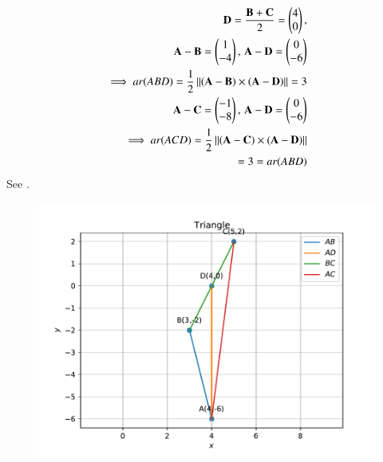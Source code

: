 \begin{align}
\mathbf{D}=\frac{\mathbf{B}+\mathbf{C}}{2}
=\begin{pmatrix}4\\ 0\end{pmatrix},
\\
	\mathbf{A}- \mathbf{B} =\begin{pmatrix}1\\ -4\end{pmatrix},\,
	  \mathbf{A}- \mathbf{D} =\begin{pmatrix}0\\ -6\end{pmatrix}
	  \\
	  \implies
  ar(ABD)=\frac{1}{2} \left\lVert\left(\mathbf{A}-\mathbf{B}\right)  \times 
   \left(\mathbf{A}- \mathbf{D}\right)\right\rVert 
	       =3	
	       \\
	\mathbf{A}- \mathbf{C} =\begin{pmatrix}-1\\ -8\end{pmatrix},\,
	  \mathbf{A}- \mathbf{D} =\begin{pmatrix}0\\ -6\end{pmatrix}
	  \\
	  \implies
  ar(ACD)=\frac{1}{2} \left\lVert\left(\mathbf{A}-\mathbf{C}\right)  \times 
   \left(\mathbf{A}- \mathbf{D}\right)\right\rVert 
   \\
	= 3 =
ar(ABD)
\end{align}
See  
.
\begin{figure}[h!]
\centering
\includegraphics[width=\columnwidth]{chapters/10/7/3/5/figs/fig.pdf}
\caption{}
\label{fig:10/7/3/5/}
\end{figure} 
